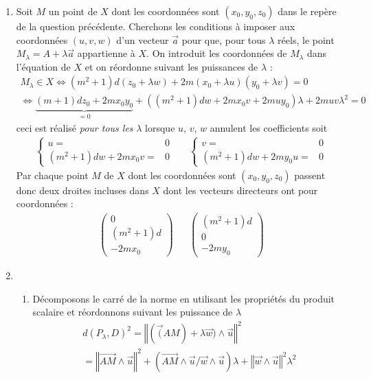 \begin{enumerate}
\item Soit $M$ un point de $X$ dont les coordonnées sont $(x_0,y_0,z_0)$ dans le repère de la question précédente. Cherchons les conditions à imposer aux coordonnées $(u,v,w)$ d'un vecteur $\overrightarrow a$ pour que, pour tous $\lambda$ réels, le point $M_\lambda = A+\lambda \overrightarrow a$ appartienne à $X$.\newline
On introduit les coordonnées de $M_\lambda$ dans l'équation de $X$ et on réordonne suivant les puissances de $\lambda$ :
\begin{multline*}
 M_\lambda \in X \Leftrightarrow
(m^2+1)d(z_0+\lambda w)+2m(x_0+\lambda u )(y_0+\lambda v)=0 \\
\Leftrightarrow
\underset{=0}{\underbrace{(m+1)dz_0+2mx_0y_0}} + \left( (m^2+1)dw+2mx_0v +2muy_0\right) \lambda +2muv\lambda ^2 =0
\end{multline*}
ceci est réalisé \emph{pour tous les} $\lambda$ lorsque $u$, $v$, $w$ annulent les coefficients soit
\begin{align*}
 \left\lbrace 
\begin{aligned}
 u =& 0 \\
(m^2+1)dw+2mx_0v =& 0
\end{aligned}
\right. 
 & & 
 \left\lbrace 
\begin{aligned}
 v =& 0 \\
(m^2+1)dw+2my_0u =& 0
\end{aligned}
\right. 
\end{align*}
Par chaque point $M$ de $X$ dont les coordonnées sont $(x_0,y_0,z_0)$ passent donc deux droites incluses dans $X$ dont les vecteurs directeurs ont pour coordonnées :
\begin{align*}
 \begin{pmatrix}
  0 \\ (m^2+1)d \\ -2mx_0
 \end{pmatrix}
& & 
\begin{pmatrix}
 (m^2+1)d  \\ 0 \\-2my_0
\end{pmatrix}
\end{align*}

\item \begin{enumerate}
 \item Décomposons le carré de la norme en utilisant les propriétés du produit scalaire et réordonnons suivant les puissance de $\lambda$
\begin{multline*}
 d(P_\lambda,D)^2 = \left\Vert(\overrightarrow(AM)+\lambda \overrightarrow w) \wedge \overrightarrow u\right\Vert^2 \\
= \left\Vert \overrightarrow{AM}\wedge \overrightarrow u\right\Vert ^2
 +\left(\overrightarrow{AM}\wedge \overrightarrow u / \overrightarrow{w}\wedge \overrightarrow u\right) \lambda
 +\left\Vert \overrightarrow{w}\wedge \overrightarrow u\right\Vert ^2 \lambda^2
\end{multline*}


\end{enumerate}
\end{enumerate}
